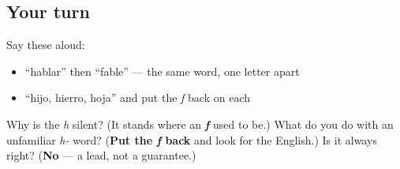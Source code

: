 \subsection*{Your turn}
Say these aloud:

\begin{itemize}
\raggedright
  \item \textquotedblleft{}hablar\textquotedblright{} then \textquotedblleft{}fable\textquotedblright{} — the same word, one letter apart
  \item \textquotedblleft{}hijo, hierro, hoja\textquotedblright{} and put the \emph{f} back on each
\end{itemize}

\begin{tcolorbox}[breakable,colback=teal!4,colframe=teal!35!black,title={Before you move on}]
Why is the \emph{h} silent? (It stands where an \emph{\textbf{f}} used to be.) What do you do with an unfamiliar \emph{h-} word? (\textbf{Put the \emph{f} back} and look for the English.) Is it always right? (\textbf{No} — a lead, not a guarantee.)
\end{tcolorbox}
